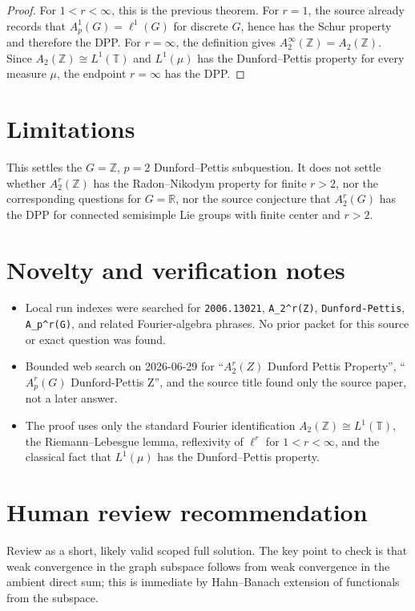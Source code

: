 \documentclass[11pt]{amsart}
\theoremstyle{remark}
\begin{document}
\begin{proof}
For $1<r<\infty$, this is the previous theorem.  For $r=1$, the source already
records that $A_p^1(G)=\ell^1(G)$ for discrete $G$, hence has the Schur
property and therefore the DPP.  For $r=\infty$, the definition gives
$A_2^\infty(\mathbb Z)=A_2(\mathbb Z)$.  Since
$A_2(\mathbb Z)\cong L^1(\mathbb T)$ and $L^1(\mu)$ has the Dunford--Pettis
property for every measure $\mu$, the endpoint $r=\infty$ has the DPP.
\end{proof}

\section*{Limitations}

This settles the $G=\mathbb Z$, $p=2$ Dunford--Pettis subquestion.  It does not
settle whether $A_2^r(\mathbb Z)$ has the Radon--Nikodym property for finite
$r>2$, nor the corresponding questions for $G=\mathbb R$, nor the source
conjecture that $A_2^r(G)$ has the DPP for connected semisimple Lie groups
with finite center and $r>2$.

\section*{Novelty and verification notes}

\begin{itemize}[leftmargin=*]
\item Local run indexes were searched for \texttt{2006.13021},
\texttt{A\_2\^{}r(Z)}, \texttt{Dunford-Pettis}, \texttt{A\_p\^{}r(G)}, and
related Fourier-algebra phrases.  No prior packet for this source or exact
question was found.
\item Bounded web search on 2026-06-29 for
``$A_2^r(Z)$ Dunford Pettis Property'', ``$A_p^r(G)$ Dunford-Pettis Z'', and
the source title found only the source paper, not a later answer.
\item The proof uses only the standard Fourier identification
$A_2(\mathbb Z)\cong L^1(\mathbb T)$, the Riemann--Lebesgue lemma, reflexivity
of $\ell^r$ for $1<r<\infty$, and the classical fact that $L^1(\mu)$ has the
Dunford--Pettis property.
\end{itemize}

\section*{Human review recommendation}

Review as a short, likely valid scoped full solution.  The key point to check
is that weak convergence in the graph subspace follows from weak convergence
in the ambient direct sum; this is immediate by Hahn--Banach extension of
functionals from the subspace.
\end{document}
